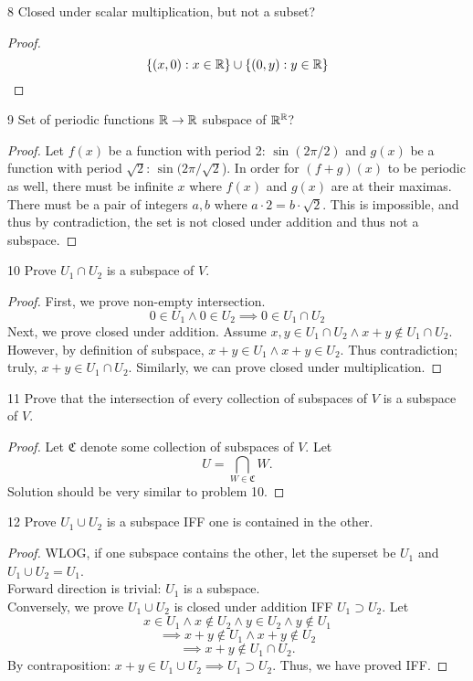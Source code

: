 \documentclass[12pt, letterpaper]{article}
\begin{document}
\begin{problem}{8}
Closed under scalar multiplication, but not a subset?
\end{problem}
\begin{proof}
$$\{(x,0):x\in\mathbb{R}\}\cup\{(0,y):y\in\mathbb{R}\}$$
\end{proof}

\begin{problem}{9}
Set of periodic functions $\mathbb{R}\to\mathbb{R}$ subspace of $\mathbb{R}^{\mathbb{R}}$?
\end{problem}
\begin{proof}
Let $f(x)$ be a function with period 2: $\sin(2\pi/2)$ and $g(x)$ be a function with period $\sqrt{2}$: $\sin(2\pi/\sqrt{2}$).
In order for $(f+g)(x)$ to be periodic as well, there must be infinite $x$ where
$f(x)$ and $g(x)$ are at their maximas. There must be a pair of integers $a,b$ where
$a\cdot2=b\cdot\sqrt{2}$. This is impossible, and thus by contradiction, the set is not closed under addition and thus not a subspace.
\end{proof}

\begin{problem}{10}
Prove $U_1\cap U_2$ is a subspace of $V$.
\end{problem}
\begin{proof}
First, we prove non-empty intersection.
$$0\in U_1\land0\in U_2\implies0\in U_1\cap U_2$$
Next, we prove closed under addition. Assume $x,y\in U_1\cap U_2\land x+y\notin U_1\cap U_2$. 
However, by definition of subspace, $x+y\in U_1\land x+y\in U_2$. 
Thus contradiction; truly, $x+y\in U_1\cap U_2$.
Similarly, we can prove closed under multiplication.
\end{proof}

\begin{problem}{11}
Prove that the intersection of every collection of subspaces of $V$ is a subspace of $V$.
\end{problem}
\begin{proof}
Let $\mathfrak{C}$ denote some collection of subspaces of $V$. Let
$$U = \bigcap_{W\in \mathfrak{C}}W.$$
Solution should be very similar to problem 10.
\end{proof}

\begin{problem}{12}
Prove $U_1\cup U_2$ is a subspace IFF one is contained in the other.
\end{problem}
\begin{proof}
WLOG, if one subspace contains the other, let the superset be $U_1$ and $U_1\cup U_2=U_1$.
\\Forward direction is trivial: $U_1$ is a subspace.
\\Conversely, we prove $U_1\cup U_2$ is closed under addition IFF $U_1\supset U_2$. Let
$$x\in U_1\land x\notin U_2 \land y\in U_2\land y\notin U_1$$
$$\implies x+y\notin U_1 \land x+y\notin U_2$$
$$\implies x+y\notin U_1\cap U_2.$$
By contraposition: $x+y\in U_1\cup U_2\implies U_1\supset U_2$. Thus, we have proved IFF.
\end{proof}
\end{document}
